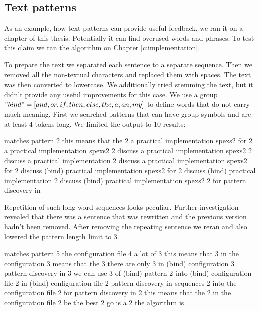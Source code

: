 \subsection{Text patterns}

As an example, how text patterns can provide useful feedback, we ran it on a chapter of this thesis. Potentially it can find overused words and phrases. To test this claim we ran the algorithm on Chapter \ref{c:implementation}. 

To prepare the text we separated each sentence to a separate sequence. Then we removed all the non-textual characters and replaced them with spaces. The text was then converted to lowercase. We additionally tried stemming the text, but it didn't provide any useful improvements for this case. We use a group $"bind" = [and, or, if, then, else, the, a, an, my]$ to define words that do not carry much meaning. First we searched patterns that can have group symbols and are at least 4 tokens long. We limited the output to 10 results:

\begin{file}
matches  pattern
2        this means that the
2        a practical implementation spexs2 for
2        a practical implementation spexs2
2        discuss a practical implementation spexs2
2        discuss a practical implementation
2        discuss a practical implementation spexs2 for
2        discuss (bind) practical implementation spexs2 for
2        discuss (bind) practical implementation
2        discuss (bind) practical implementation spexs2
2        for pattern discovery in
\end{file}

Repetition of such long word sequences looks peculiar. Further investigation revealed that there was a sentence that was rewritten and the previous version hadn't been removed. After removing the repeating sentence we reran and also lowered the pattern length limit to 3.

\begin{file}
matches  pattern
5        the configuration file
4        a lot of
3        this means that
3        in the configuration
3        means that the
3        there are only
3        in (bind) configuration
3        pattern discovery in
3        we can use
3        of (bind) pattern
2        into (bind) configuration file
2        in (bind) configuration file
2        pattern discovery in sequences
2        into the configuration file
2        for pattern discovery in
2        this means that the
2        in the configuration file
2        be the best
2        go is a
2        the algorithm is
\end{file}

